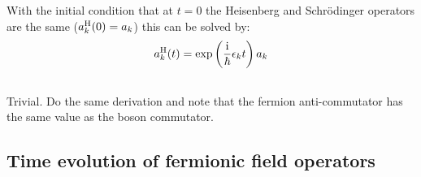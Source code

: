 \documentclass[11pt, english, fleqn, DIV=15, headinclude, BCOR=1.5cm]{scrartcl}
\begin{document}
With the initial condition that at $t = 0$ the Heisenberg and Schrödinger
operators are the same ($a_k^{\text H}(0) = a_k$) this can be solved by:
\[
    a_k^{\text H}(t) = \exp\left( \frac{\mathrm i}\hbar \epsilon_k t \right) a_k
\]

\subsection{}

Trivial. Do the same derivation and note that the fermion anti-commutator has
the same value as the boson commutator.

\begin{landscape}

\section{Time evolution of fermionic field operators}


\end{landscape}
\end{document}

